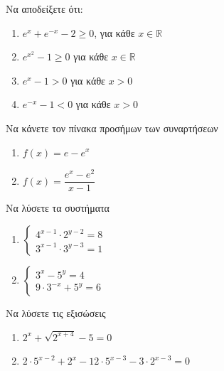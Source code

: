 \documentclass{presentation}
\begin{document}
\begin{askisi}

  Να αποδείξετε ότι:
  \begin{enumerate}
    \item<1-> $e^x+e^{-x}-2\ge 0$, για κάθε $x\in \mathbb{R}$
    \item<2-> $e^{x^2}-1\ge 0$ για κάθε $x\in\mathbb{R}$
    \item<3-> $e^x-1>0$ για κάθε $x>0$
    \item<4-> $e^{-x}-1<0$ για κάθε $x>0$
  \end{enumerate}


\end{askisi}

\begin{askisi}
  Να κάνετε τον πίνακα προσήμων των συναρτήσεων
  \begin{enumerate}
    \item<1-> $f(x)=e-e^x$
    \item<2-> $f(x)=\dfrac{e^x-e^2}{x-1}$
  \end{enumerate}


\end{askisi}

\begin{askisi}
  Να λύσετε τα συστήματα
  \begin{enumerate}
    \item<1-> $\begin{cases}
              4^{x-1}\cdot 2^{y-2}=8 \\
              3^{x-1}\cdot 3^{y-3}=1
            \end{cases}$
    \item<2-> $\begin{cases}
              3^{x}- 5^{y}=4 \\
              9\cdot 3^{-x}+ 5^{y}=6
            \end{cases}$
  \end{enumerate}


\end{askisi}

\begin{askisi}
  Να λύσετε τις εξισώσεις
  \begin{enumerate}
    \item<1-> $2^x+\sqrt{2^{x+4}}-5=0$
    \item<2-> $2\cdot 5^{x-2}+2^x-12\cdot 5^{x-3}-3\cdot 2^{x-3}=0$
  \end{enumerate}


\end{askisi}
\end{document}
